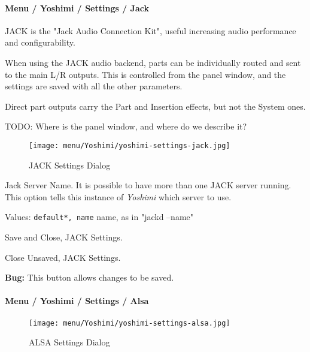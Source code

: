 \paragraph{Menu / Yoshimi / Settings / Jack}
\label{paragraph:menu_yoshimi_settings_jack}

   JACK is the "Jack Audio Connection Kit", useful increasing audio
   performance and configurability.

   When using the JACK audio backend, parts can be individually routed
   and sent to the main L/R outputs. This is controlled from the panel
   window, and the settings are saved with all the other parameters.

   Direct part outputs carry the Part and Insertion effects, but not the
   System ones.

   TODO:  Where is the panel window, and where do we describe it?

\begin{figure}[H]
   \centering 
   \texttt{[image: menu/Yoshimi/yoshimi-settings-jack.jpg]}
   \caption[JACK Settings]{JACK Settings Dialog}
   \label{fig:yoshimi_settings_jack}
\end{figure}

   \setcounter{ItemCounter}{0}      %

   Jack Server Name.
   It is possible to have more than one JACK server running.  This option
   tells this instance of \textsl{Yoshimi} which server to use.

   Values: \texttt{default*, name} name, as in "jackd --name"

   Save and Close, JACK Settings.

   Close Unsaved, JACK Settings.

   \textbf{Bug:}
   This button allows changes to be saved.

\paragraph{Menu / Yoshimi / Settings / Alsa}
\label{paragraph:menu_yoshimi_settings_alsa}

\begin{figure}[H]
   \centering 
   \texttt{[image: menu/Yoshimi/yoshimi-settings-alsa.jpg]}
   \caption[ALSA Settings]{ALSA Settings Dialog}
   \label{fig:yoshimi_settings_alsa}
\end{figure}

